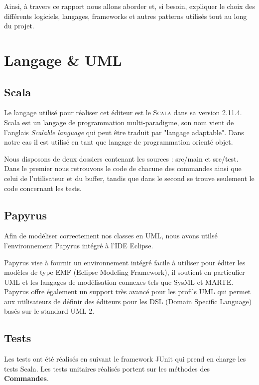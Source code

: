 \documentclass[a4paper,11pt]{article}
\begin{document}
\noindent Ainsi, à travers ce rapport nous allons aborder et, si besoin, expliquer le choix des différents logiciels, langages, frameworks et autres patterns utilisés tout au long du projet.

\bigskip
\bigskip

\section{Langage \& UML}\label{sec:lang_papy}
\bigskip

\subsection{Scala}\label{subsec:scala}
Le langage utilisé pour réaliser cet éditeur est le \textsc{Scala} dans sa version 2.11.4. Scala est un langage de programmation multi-paradigme, son nom vient de l'anglais \emph{Scalable language} qui peut être traduit par "langage adaptable". Dans notre cas il est utilisé en tant que langage de programmation orienté objet.

\noindent Nous disposons de deux dossiers contenant les sources : src/main et src/test. Dans le premier nous retrouvons le code de chacune des commandes ainsi que celui de l'utilisateur et du buffer, tandis que dans le second se trouve seulement le code concernant les tests.

\subsection{Papyrus}\label{subsec:papyrus}
Afin de modéliser correctement nos classes en UML, nous avons utilsé l'environnement Papyrus intégré à l'IDE Eclipse.
\smallskip

\noindent Papyrus vise à fournir un environnement intégré facile à utiliser pour éditer les modèles de type EMF (Eclipse Modeling Framework), il soutient en particulier UML et les langages de modélisation connexes tels que SysML et MARTE. Papyrus offre également un support très avancé pour les profils UML qui permet aux utilisateurs de définir des éditeurs pour les DSL (Domain Specific Language) basés sur le standard UML 2.

\subsection{Tests}\label{subsec:tests}
Les tests ont été réalisés en suivant le framework JUnit qui prend en charge les tests Scala. Les tests unitaires réalisés portent sur les méthodes des \textbf{Commandes}.
\end{document}
